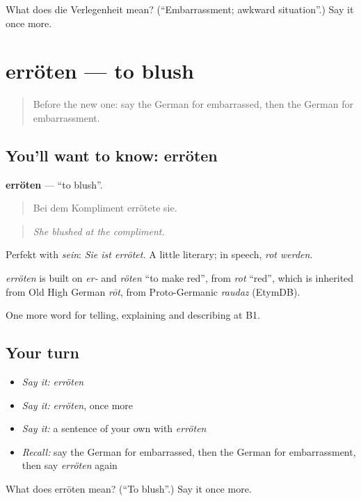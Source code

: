 \begin{tcolorbox}[breakable,colback=teal!4,colframe=teal!35!black,title={Before you move on}]
What does die Verlegenheit mean? (\textquotedblleft{}Embarrassment; awkward situation\textquotedblright{}.) Say it once more.
\end{tcolorbox}
\section[erröten]{erröten — to blush}

\label{lesson:GE-C467-erroeten}



\begin{quote}
Before the new one: say the German for embarrassed, then the German for embarrassment.
\end{quote}

\subsection*{You'll want to know: erröten}
\textbf{erröten} — \textquotedblleft{}to blush\textquotedblright{}.

\begin{quote}
Bei dem Kompliment errötete sie.
\end{quote}

\begin{quote}
\emph{She blushed at the compliment.}
\end{quote}

Perfekt with \emph{sein}: \emph{Sie ist errötet.} A little literary; in speech, \emph{rot werden}.

\begin{cousinweb}
\emph{erröten} is built on \emph{er-} and \emph{röten} \textquotedblleft{}to make red\textquotedblright{}, from \emph{rot} \textquotedblleft{}red\textquotedblright{}, which is inherited from Old High German \emph{rōt}, from Proto-Germanic \emph{raudaz} (EtymDB).
\end{cousinweb}

\begin{grammarlens}[title={What you've built}]
One more word for telling, explaining and describing at B1.
\end{grammarlens}

\subsection*{Your turn}
\begin{itemize}
\raggedright
  \item \emph{Say it:} \emph{erröten}
  \item \emph{Say it:} \emph{erröten}, once more
  \item \emph{Say it:} a sentence of your own with \emph{erröten}
  \item \emph{Recall:} say the German for embarrassed, then the German for embarrassment, then say \emph{erröten} again
\end{itemize}

\begin{tcolorbox}[breakable,colback=teal!4,colframe=teal!35!black,title={Before you move on}]
What does erröten mean? (\textquotedblleft{}To blush\textquotedblright{}.) Say it once more.
\end{tcolorbox}
